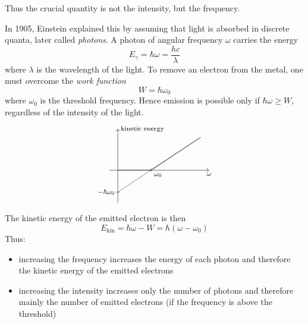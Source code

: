 Thus the crucial quantity is not the intensity, but the frequency.


In 1905, Einstein explained this by assuming that light is absorbed in discrete quanta, later called \emph{photons}.
A photon of angular frequency \(\omega\) carries the energy
\begin{equation}\label{eq:photon-energy}
\boxed{
E_{\gamma} 
= 
\hbar \omega
=
\frac{h c}{\lambda}
}
\end{equation}
where \(\lambda\) is the wavelength of the light.
To remove an electron from the metal, one must overcome the \emph{work function}
\[
W = \hbar \omega_0
\]
where \(\omega_0\) is the threshold frequency.
Hence emission is possible only if
\(
\hbar \omega \geq W
\), regardless of the intensity of the light.
\[
\begin{tikzpicture}[scale=0.7]
  \draw[->] (-0.5,0) -- (5.5,0) node [anchor=north, font=\footnotesize] {$\omega$};
  \draw[->] (0,-2.0) -- (0,2.5) node [anchor=west, font=\footnotesize] {kinetic energy};

  \draw[gray!50!black, thick] (0,0) -- (2,0);
  \draw[gray!50!black, thick] (2,0) -- (5,2);
  \draw[black] (-0.1, -4/3) -- (0.1, -4/3);
  \draw[gray!50!black, thick, densely dotted] (0,-4/3) -- node[pos=0, anchor=east, black, font=\footnotesize] {$-\hbar \omega_0$}  (2,0) node[anchor=north west, black, font=\footnotesize] {$\omega_0$};
  \draw[black] (2, -0.1) -- (2, 0.1);
\end{tikzpicture}
\]
The kinetic energy of the emitted electron is then
\[
E_{\mathrm{kin}} 
= 
\hbar \omega - W
=
\hbar (\omega - \omega_0)
\]
Thus:
\begin{itemize}
  \item increasing the frequency increases the energy of each photon and therefore the kinetic energy of the emitted electrons
  \item increasing the intensity increases only the number of photons and therefore mainly the number of emitted electrons (if the frequency is above the threshold)
\end{itemize}


